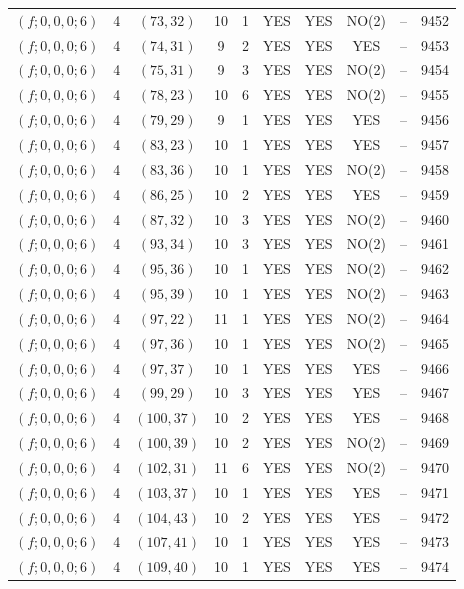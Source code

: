 \begin{longtable}{|c|c|c|c|c|c|c|c|c|c|}
$(f; 0, 0, 0; 6)$ & 4 & $(73, 32)$ & 10 & 1 & YES & YES & NO(2) & -- & 9452\\
$(f; 0, 0, 0; 6)$ & 4 & $(74, 31)$ & 9 & 2 & YES & YES & YES & -- & 9453\\
$(f; 0, 0, 0; 6)$ & 4 & $(75, 31)$ & 9 & 3 & YES & YES & NO(2) & -- & 9454\\
$(f; 0, 0, 0; 6)$ & 4 & $(78, 23)$ & 10 & 6 & YES & YES & NO(2) & -- & 9455\\
$(f; 0, 0, 0; 6)$ & 4 & $(79, 29)$ & 9 & 1 & YES & YES & YES & -- & 9456\\
$(f; 0, 0, 0; 6)$ & 4 & $(83, 23)$ & 10 & 1 & YES & YES & YES & -- & 9457\\
$(f; 0, 0, 0; 6)$ & 4 & $(83, 36)$ & 10 & 1 & YES & YES & NO(2) & -- & 9458\\
$(f; 0, 0, 0; 6)$ & 4 & $(86, 25)$ & 10 & 2 & YES & YES & YES & -- & 9459\\
$(f; 0, 0, 0; 6)$ & 4 & $(87, 32)$ & 10 & 3 & YES & YES & NO(2) & -- & 9460\\
$(f; 0, 0, 0; 6)$ & 4 & $(93, 34)$ & 10 & 3 & YES & YES & NO(2) & -- & 9461\\
$(f; 0, 0, 0; 6)$ & 4 & $(95, 36)$ & 10 & 1 & YES & YES & NO(2) & -- & 9462\\
$(f; 0, 0, 0; 6)$ & 4 & $(95, 39)$ & 10 & 1 & YES & YES & NO(2) & -- & 9463\\
$(f; 0, 0, 0; 6)$ & 4 & $(97, 22)$ & 11 & 1 & YES & YES & NO(2) & -- & 9464\\
$(f; 0, 0, 0; 6)$ & 4 & $(97, 36)$ & 10 & 1 & YES & YES & NO(2) & -- & 9465\\
$(f; 0, 0, 0; 6)$ & 4 & $(97, 37)$ & 10 & 1 & YES & YES & YES & -- & 9466\\
$(f; 0, 0, 0; 6)$ & 4 & $(99, 29)$ & 10 & 3 & YES & YES & YES & -- & 9467\\
$(f; 0, 0, 0; 6)$ & 4 & $(100, 37)$ & 10 & 2 & YES & YES & YES & -- & 9468\\
$(f; 0, 0, 0; 6)$ & 4 & $(100, 39)$ & 10 & 2 & YES & YES & NO(2) & -- & 9469\\
$(f; 0, 0, 0; 6)$ & 4 & $(102, 31)$ & 11 & 6 & YES & YES & NO(2) & -- & 9470\\
$(f; 0, 0, 0; 6)$ & 4 & $(103, 37)$ & 10 & 1 & YES & YES & YES & -- & 9471\\
$(f; 0, 0, 0; 6)$ & 4 & $(104, 43)$ & 10 & 2 & YES & YES & YES & -- & 9472\\
$(f; 0, 0, 0; 6)$ & 4 & $(107, 41)$ & 10 & 1 & YES & YES & YES & -- & 9473\\
$(f; 0, 0, 0; 6)$ & 4 & $(109, 40)$ & 10 & 1 & YES & YES & YES & -- & 9474\\

\end{longtable}
